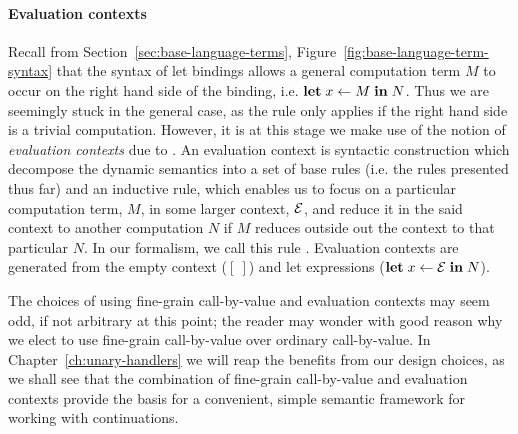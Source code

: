 \documentclass[12pt,phd,lfcs,twoside,openright,logo,leftchapter,normalheadings]{infthesis}
\theoremstyle{plain}
\theoremstyle{definition}
\begin{document}
\paragraph{Evaluation contexts}
Recall from Section~\ref{sec:base-language-terms},
Figure~\ref{fig:base-language-term-syntax} that the syntax of let
bindings allows a general computation term $M$ to occur on the right
hand side of the binding, i.e. $\mathbf{let}\;x \leftarrow M \;\mathbf{in}\;N$. Thus we
are seemingly stuck in the general case, as the  rule only
applies if the right hand side is a trivial computation.
%
However, it is at this stage we make use of the notion of
\emph{evaluation contexts} due to \citet{Felleisen87}. An evaluation
context is syntactic construction which decompose the dynamic
semantics into a set of base rules (i.e. the rules presented thus far)
and an inductive rule, which enables us to focus on a particular
computation term, $M$, in some larger context, $\mathcal{E}$, and reduce it in
the said context to another computation $N$ if $M$ reduces outside out
the context to that particular $N$. In our formalism, we call this
rule . Evaluation contexts are generated from the empty
context ($[~]$) and let expressions ($\mathbf{let}\;x \leftarrow \mathcal{E} \;\mathbf{in}\;N$).

The choices of using fine-grain call-by-value and evaluation contexts
may seem odd, if not arbitrary at this point; the reader may wonder
with good reason why we elect to use fine-grain call-by-value over
ordinary call-by-value.  In Chapter~\ref{ch:unary-handlers} we will
reap the benefits from our design choices, as we shall see that the
combination of fine-grain call-by-value and evaluation contexts
provide the basis for a convenient, simple semantic framework for
working with continuations.
\end{document}
